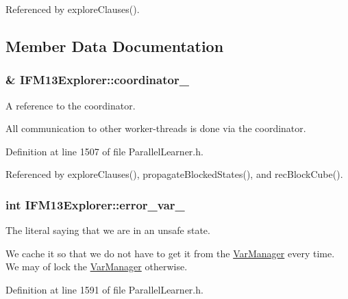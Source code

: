 Referenced by explore\-Clauses().



\subsection{Member Data Documentation}
\hypertarget{classIFM13Explorer_aff7fd95615eb7508a22b6b4992061678}{
\subsubsection[{coordinator\-\_\-}]{\& I\-F\-M13\-Explorer\-::coordinator\-\_\-\hspace{0.3cm}{\ttfamily [protected]}}}\label{classIFM13Explorer_aff7fd95615eb7508a22b6b4992061678}


A reference to the coordinator. 

All communication to other worker-\/threads is done via the coordinator. 

Definition at line 1507 of file Parallel\-Learner.\-h.



Referenced by explore\-Clauses(), propagate\-Blocked\-States(), and rec\-Block\-Cube().

\hypertarget{classIFM13Explorer_a222a8be4c6ce2e54488aabb9b882f8c9}{
\subsubsection[{error\-\_\-var\-\_\-}]{\setlength{\rightskip}{0pt plus 5cm}int I\-F\-M13\-Explorer\-::error\-\_\-var\-\_\-\hspace{0.3cm}{\ttfamily [protected]}}}\label{classIFM13Explorer_a222a8be4c6ce2e54488aabb9b882f8c9}


The literal saying that we are in an unsafe state. 

We cache it so that we do not have to get it from the \hyperlink{classVarManager}{Var\-Manager} every time. We may of lock the \hyperlink{classVarManager}{Var\-Manager} otherwise. 

Definition at line 1591 of file Parallel\-Learner.\-h.



